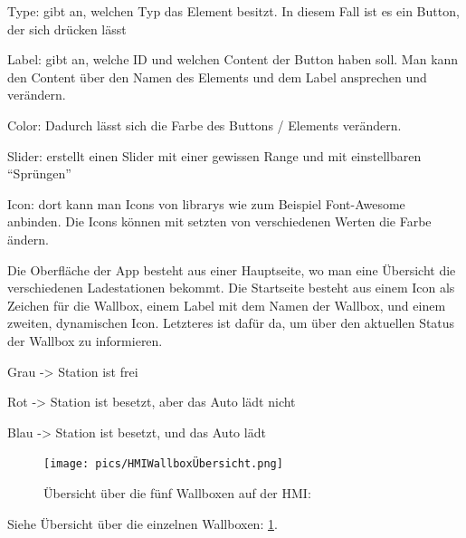 \begin{compactitem}
  \item Type: gibt an, welchen Typ das Element besitzt. In diesem Fall ist es ein Button, der sich drücken lässt 
  \item Label: gibt an, welche ID und welchen Content der Button haben soll. Man kann den Content über den Namen des Elements und dem Label ansprechen und verändern.
  \item Color: Dadurch lässt sich die Farbe des Buttons / Elements verändern. 
  \item Slider: erstellt einen Slider mit einer gewissen Range und mit einstellbaren “Sprüngen” 
  \item Icon: dort kann man Icons von librarys wie zum Beispiel Font-Awesome anbinden. Die Icons können mit setzten von verschiedenen Werten die Farbe ändern. 
\end{compactitem}
Die Oberfläche der App besteht aus einer Hauptseite, wo man eine Übersicht die verschiedenen Ladestationen bekommt. Die Startseite besteht aus einem Icon als Zeichen für die Wallbox, einem Label mit dem Namen der Wallbox, und einem zweiten, dynamischen Icon. Letzteres ist dafür da, um über den aktuellen Status der Wallbox zu informieren.  

\begin{compactitem}
  \item Grau -> Station ist frei 
  \item Rot -> Station ist besetzt, aber das Auto lädt nicht 
  \item Blau -> Station ist besetzt, und das Auto lädt 
\end{compactitem}


\begin{figure}[h t]
  \centering
  \texttt{[image: pics/HMIWallboxÜbersicht.png]}
  \caption{Übersicht über die fünf Wallboxen auf der HMI: }
  \label{fig:impl:HMIWallboxÜbersicht}
\end{figure}

Siehe Übersicht über die einzelnen Wallboxen: \ref{fig:impl:HMIWallboxÜbersicht}.



